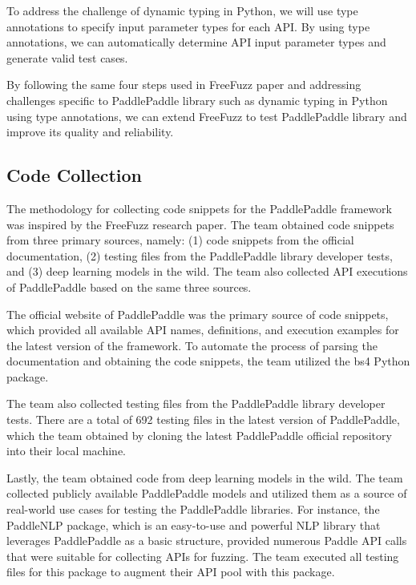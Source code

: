 \documentclass[sigconf]{acmart}
\begin{document}
To address the challenge of dynamic typing in Python, we will use type annotations to specify input parameter types for each API. By using type annotations, we can automatically determine API input parameter types and generate valid test cases.

By following the same four steps used in FreeFuzz paper and addressing challenges specific to PaddlePaddle library such as dynamic typing in Python using type annotations, we can extend FreeFuzz to test PaddlePaddle library and improve its quality and reliability.
  
  \subsection{Code Collection}
  \par The methodology for collecting code snippets for the PaddlePaddle framework was inspired by the FreeFuzz research paper. 
  The team obtained code snippets from three primary sources, namely: (1) code snippets from the official documentation, 
  (2) testing files from the PaddlePaddle library developer tests, and (3) deep learning models in the wild. 
  The team also collected API executions of PaddlePaddle based on the same three sources.

  \par The official website of PaddlePaddle was the primary source of code snippets, which provided all available API names, 
  definitions, and execution examples for the latest version of the framework. To automate the process of parsing the documentation and obtaining the code snippets, 
  the team utilized the bs4 Python package. 

  \par The team also collected testing files from the PaddlePaddle library developer tests. 
  There are a total of 692 testing files in the latest version of PaddlePaddle, which the team obtained by cloning the latest PaddlePaddle official repository into their local machine.

  \par Lastly, the team obtained code from deep learning models in the wild. 
  The team collected publicly available PaddlePaddle models and utilized them as a source of real-world use cases for testing the PaddlePaddle libraries. 
  For instance, the PaddleNLP package, which is an easy-to-use and powerful NLP library that leverages PaddlePaddle as a basic structure, provided numerous Paddle API calls that were suitable for collecting APIs for fuzzing. 
  The team executed all testing files for this package to augment their API pool with this package.
    
\end{document}
